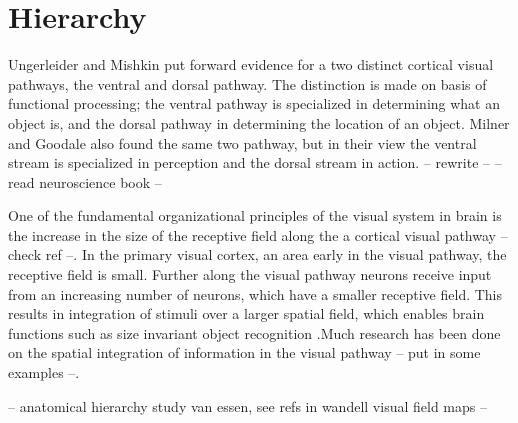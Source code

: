 \section{Hierarchy}

Ungerleider and Mishkin \cite{mishkin1983object} put forward evidence for a two distinct cortical visual pathways, the ventral and dorsal pathway. The distinction is made on basis of functional processing; the ventral pathway is specialized in determining what an object is, and the dorsal pathway in determining the location of an object. Milner and Goodale \cite{milner2008two, goodale1992separate} also found the same two pathway, but in their view the ventral stream is specialized in perception and the dorsal stream in action. -- rewrite -- --read neuroscience book --

One of the fundamental organizational principles of the visual system in brain is the increase in the size of the receptive field along the a cortical visual pathway \cite{hubel1988eye,hubel1962receptive,lerner2001hierarchical} -- check ref --. In the primary visual cortex, an area early in the visual pathway, the receptive field is small. Further along the visual pathway neurons receive input from an increasing number of neurons, which have a smaller receptive field. This results in integration of stimuli over a larger spatial field, which enables brain functions such as size invariant object recognition \cite{kobatake1994neuronal}.Much research has been done on the spatial integration of information in the visual pathway \cite{deyoe1996mapping} -- put in some examples --. 


-- anatomical hierarchy study van essen, see refs in wandell visual field maps --


